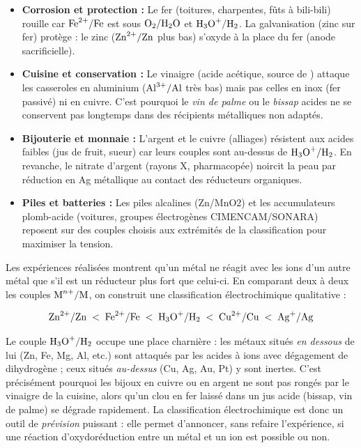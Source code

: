\documentclass[11pt]{article}
\newcommand{\cle}[1]{{\popxbold\color{popdark}#1}}
\newcounter{popsec}
\newcounter{popsub}
\newcommand{\courssub}[1]{%
  \stepcounter{popsub}%
  \par\vspace{9pt}\noindent{\popxbold\fontsize{11.5}{13}\selectfont\color{popink}{\color{poporange}\thepopsec.\thepopsub}\hspace{6pt}#1}\par\nopagebreak\vspace{4pt}
}
\begin{document}
\begin{savaistu}
\begin{itemize}
\item \textbf{Corrosion et protection :} Le fer (toitures, charpentes, fûts à bili-bili) rouille car $\ce{Fe^2+}/\ce{Fe}$ est sous $\ce{O2}/\ce{H2O}$ et $\ce{H3O+}/\ce{H2}$. La galvanisation (zinc sur fer) protège : le zinc ($\ce{Zn^2+}/\ce{Zn}$ plus bas) s'oxyde à la place du fer (anode sacrificielle).
\item \textbf{Cuisine et conservation :} Le vinaigre (acide acétique, source de ) attaque les casseroles en aluminium ($\ce{Al^3+}/\ce{Al}$ très bas) mais pas celles en inox (fer passivé) ni en cuivre. C'est pourquoi le \emph{vin de palme} ou le \emph{bissap} acides ne se conservent pas longtemps dans des récipients métalliques non adaptés.
\item \textbf{Bijouterie et monnaie :} L'argent et le cuivre (alliages) résistent aux acides faibles (jus de fruit, sueur) car leurs couples sont au-dessus de $\ce{H3O+}/\ce{H2}$. En revanche, le nitrate d'argent (rayons X, pharmacopée) noircit la peau par réduction en Ag métallique au contact des réducteurs organiques.
\item \textbf{Piles et batteries :} Les piles alcalines (Zn/MnO2) et les accumulateurs plomb-acide (voitures, groupes électrogènes CIMENCAM/SONARA) reposent sur des couples choisis aux extrémités de la classification pour maximiser la tension.
\end{itemize}
\end{savaistu}

\courssub{Conclusion}

Les expériences réalisées montrent qu'un métal ne réagit avec les ions d'un autre métal que s'il est un \cle{réducteur plus fort} que celui-ci. En comparant deux à deux les couples $\ce{M^{n+}}/\ce{M}$, on construit une \cle{classification électrochimique qualitative} :

\[ \ce{Zn^2+}/\ce{Zn} \;<\; \ce{Fe^2+}/\ce{Fe} \;<\; \ce{H3O+}/\ce{H2} \;<\; \ce{Cu^2+}/\ce{Cu} \;<\; \ce{Ag+}/\ce{Ag} \]

Le couple $\ce{H3O+}/\ce{H2}$ occupe une place charnière : les métaux situés \emph{en dessous} de lui (Zn, Fe, Mg, Al, etc.) sont attaqués par les acides à ions  avec dégagement de dihydrogène ; ceux situés \emph{au-dessus} (Cu, Ag, Au, Pt) y sont inertes. C'est précisément pourquoi les bijoux en cuivre ou en argent ne sont pas rongés par le vinaigre de la cuisine, alors qu'un clou en fer laissé dans un jus acide (bissap, vin de palme) se dégrade rapidement. La classification électrochimique est donc un outil de \emph{prévision} puissant : elle permet d'annoncer, sans refaire l'expérience, si une réaction d'oxydoréduction entre un métal et un ion est possible ou non.
\end{document}
